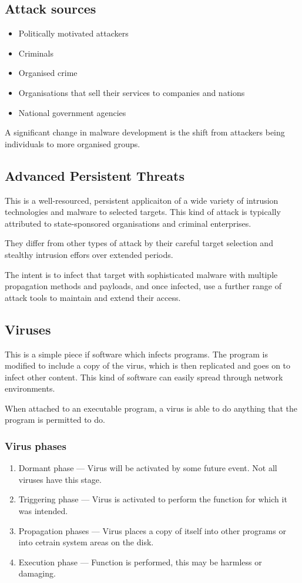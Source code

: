 \subsection{Attack sources}
\begin{itemize}
    \item Politically motivated attackers
    \item Criminals
    \item Organised crime
    \item Organisations that sell their services to companies and nations
    \item National government agencies
\end{itemize}

A significant change in malware development is the shift from attackers being individuals to more organised groups.

\subsection{Advanced Persistent Threats}
This is a well-resourced, persistent applicaiton of a wide variety of intrusion technologies and malware to selected targets.
This kind of attack is typically attributed to state-sponsored organisations and criminal enterprises.

They differ from other types of attack by their careful target selection and stealthy intrusion effors over extended periods.

The intent is to infect that target with sophisticated malware with multiple propagation methods and payloads, and once infected, use
a further range of attack tools to maintain and extend their access.

\subsection{Viruses}
This is a simple piece if software which infects programs. The program is modified to include a copy of the virus, which is then replicated and goes on to infect
other content. This kind of software can easily spread through network environments.

When attached to an executable program, a virus is able to do anything that the program is permitted to do.

\subsubsection{Virus phases}
\begin{enumerate}
    \item Dormant phase --- Virus will be activated by some future event. Not all viruses have this stage.
    \item Triggering phase --- Virus is activated to perform the function for which it was intended.
    \item Propagation phases --- Virus places a copy of itself into other programs or into cetrain system areas on the disk.
    \item Execution phase --- Function is performed, this may be harmless or damaging.
\end{enumerate}

